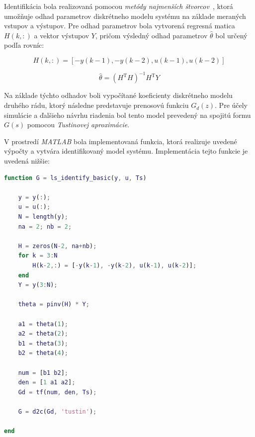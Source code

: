 Identifikácia bola realizovaná pomocou \textit{metódy najmenších štvorcov}~\cite{fikar},  
ktorá umožňuje odhad parametrov diskrétneho modelu systému na základe meraných vstupov a výstupov.  
Pre odhad parametrov bola vytvorená regresná matica $H(k,:)$ a vektor výstupov $Y$, pričom výsledný odhad parametrov $\hat{\theta}$ bol určený podľa rovníc:

\begin{equation}
    H(k,:) = [-y(k-1), -y(k-2), u(k-1), u(k-2)]
    \label{eq:phi_matrix}
\end{equation}

\begin{equation}
    \hat{\theta} = (H^\mathrm{T}H)^{-1}H^\mathrm{T}Y
    \label{eq:theta_estimation}
\end{equation}

Na základe týchto odhadov boli vypočítané koeficienty diskrétneho modelu druhého rádu,  
ktorý následne predstavuje prenosovú funkciu $G_d(z)$.  
Pre účely simulácie a ďalšieho návrhu riadenia bol tento model prevedený na spojitú formu $G(s)$ pomocou \textit{Tustinovej aproximácie}.

V prostredí \textit{MATLAB} bola implementovaná funkcia, ktorá realizuje uvedené výpočty a vytvára identifikovaný model systému.  
Implementácia tejto funkcie je uvedená nižšie:

\begin{lstlisting}[language=Matlab, 
caption={MATLAB implementácia identifikácie metódou najmenších štvorcov},
label={lst:ls_identify_basic}]
function G = ls_identify_basic(y, u, Ts)
    
    y = y(:);
    u = u(:);
    N = length(y);
    na = 2; nb = 2;
    
    H = zeros(N-2, na+nb);
    for k = 3:N
        H(k-2,:) = [-y(k-1), -y(k-2), u(k-1), u(k-2)];
    end
    Y = y(3:N);
    
    theta = pinv(H) * Y;  
    
    a1 = theta(1); 
    a2 = theta(2);
    b1 = theta(3); 
    b2 = theta(4);
    
    num = [b1 b2];
    den = [1 a1 a2];
    Gd = tf(num, den, Ts);
    
    G = d2c(Gd, 'tustin');

end

\end{lstlisting}


